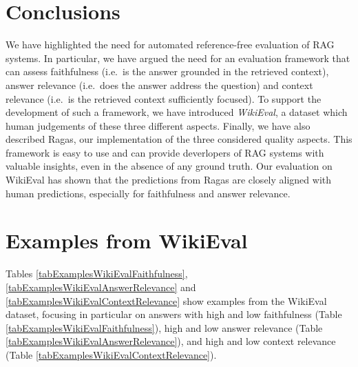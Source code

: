 \documentclass[11pt]{article}
\newcommand{\red}[1]{\textcolor{red}{#1}}
\newcommand{\todo}[1]{\red{\textsc{todo:} #1}}
\begin{document}


\section{Conclusions}
We have highlighted the need for automated reference-free evaluation of RAG systems. In particular, we have argued the need for an evaluation framework that can assess faithfulness (i.e.\ is the answer grounded in the retrieved context), answer relevance (i.e.\ does the answer address the question) and context relevance (i.e.\ is the retrieved context sufficiently focused). To support the development of such a framework, we have introduced \textit{WikiEval}, a dataset which human judgements of these three different aspects. Finally, we have also described Ragas, our implementation of the three considered quality aspects. This framework is easy to use and can provide deverlopers of RAG systems with valuable insights, even in the absence of any ground truth. Our evaluation on WikiEval has shown that the predictions from Ragas are closely aligned with human predictions, especially for faithfulness and answer relevance. 







\appendix


\section{Examples from WikiEval}
Tables \ref{tabExamplesWikiEvalFaithfulness}, \ref{tabExamplesWikiEvalAnswerRelevance} and \ref{tabExamplesWikiEvalContextRelevance} show examples from the WikiEval dataset, focusing in particular on answers with high and low faithfulness (Table \ref{tabExamplesWikiEvalFaithfulness}), high and low answer relevance (Table \ref{tabExamplesWikiEvalAnswerRelevance}), and high and low context relevance (Table \ref{tabExamplesWikiEvalContextRelevance}).
\end{document}
